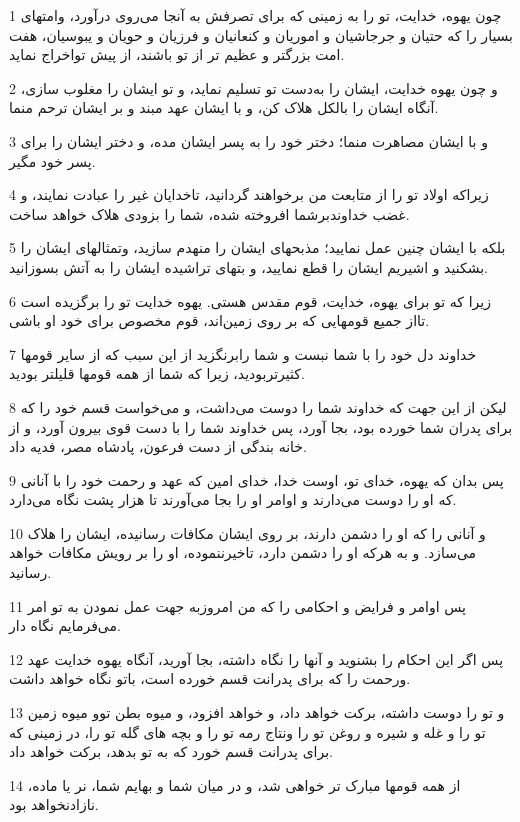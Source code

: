 \par 1 چون یهوه، خدایت، تو را به زمینی که برای تصرفش به آنجا می‌روی درآورد، وامتهای بسیار را که حتیان و جرجاشیان و اموریان و کنعانیان و فرزیان و حویان و یبوسیان، هفت امت بزرگتر و عظیم تر از تو باشند، از پیش تواخراج نماید.
\par 2 و چون یهوه خدایت، ایشان را به‌دست تو تسلیم نماید، و تو ایشان را مغلوب سازی، آنگاه ایشان را بالکل هلاک کن، و با ایشان عهد مبند و بر ایشان ترحم منما.
\par 3 و با ایشان مصاهرت منما؛ دختر خود را به پسر ایشان مده، و دختر ایشان را برای پسر خود مگیر.
\par 4 زیراکه اولاد تو را از متابعت من برخواهند گردانید، تاخدایان غیر را عبادت نمایند، و غضب خداوندبرشما افروخته شده، شما را بزودی هلاک خواهد ساخت.
\par 5 بلکه با ایشان چنین عمل نمایید؛ مذبحهای ایشان را منهدم سازید، وتمثالهای ایشان را بشکنید و اشیریم ایشان را قطع نمایید، و بتهای تراشیده ایشان را به آتش بسوزانید.
\par 6 زیرا که تو برای یهوه، خدایت، قوم مقدس هستی. یهوه خدایت تو را برگزیده است تااز جمیع قومهایی که بر روی زمین‌اند، قوم مخصوص برای خود او باشی.
\par 7 خداوند دل خود را با شما نبست و شما رابرنگزید از این سبب که از سایر قومها کثیرتربودید، زیرا که شما از همه قومها قلیلتر بودید.
\par 8 لیکن از این جهت که خداوند شما را دوست می‌داشت، و می‌خواست قسم خود را که برای پدران شما خورده بود، بجا آورد، پس خداوند شما را با دست قوی بیرون آورد، و از خانه بندگی از دست فرعون، پادشاه مصر، فدیه داد.
\par 9 پس بدان که یهوه، خدای تو، اوست خدا، خدای امین که عهد و رحمت خود را با آنانی که او را دوست می‌دارند و اوامر او را بجا می‌آورند تا هزار پشت نگاه می‌دارد.
\par 10 و آنانی را که او را دشمن دارند، بر روی ایشان مکافات رسانیده، ایشان را هلاک می‌سازد. و به هرکه او را دشمن دارد، تاخیرننموده، او را بر رویش مکافات خواهد رسانید.
\par 11 پس اوامر و فرایض و احکامی را که من امروزبه جهت عمل نمودن به تو امر می‌فرمایم نگاه دار.
\par 12 پس اگر این احکام را بشنوید و آنها را نگاه داشته، بجا آورید، آنگاه یهوه خدایت عهد ورحمت را که برای پدرانت قسم خورده است، باتو نگاه خواهد داشت.
\par 13 و تو را دوست داشته، برکت خواهد داد، و خواهد افزود، و میوه بطن توو میوه زمین تو را و غله و شیره و روغن تو را ونتاج رمه تو را و بچه های گله تو را، در زمینی که برای پدرانت قسم خورد که به تو بدهد، برکت خواهد داد.
\par 14 از همه قومها مبارک تر خواهی شد، و در میان شما و بهایم شما، نر یا ماده، نازادنخواهد بود.
